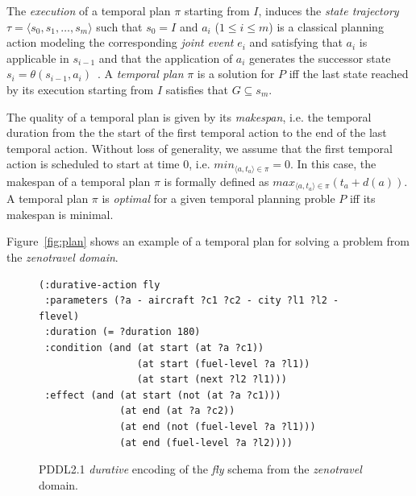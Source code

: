 \documentclass[letterpaper]{article} %
\newcommand{\tup}[1]{{\langle #1 \rangle}}
\begin{document}
The {\em execution} of a temporal plan $\pi$ starting from $I$, induces the {\em state trajectory} $\tau=\tup{s_0, s_1, \ldots, s_m}$ such that $s_0=I$ and $a_i$ ({\small $1\leq i\leq m$}) is a classical planning action modeling the corresponding {\em joint event} $e_i$ and satisfying that $a_i$ is applicable in $s_{i-1}$ and that the application of $a_i$ generates the successor state $s_i=\theta(s_{i-1},a_i)$~\cite{jimenez2015temporal}. A {\em temporal plan} $\pi$ is a solution for $P$ iff the last state reached by its execution starting from $I$ satisfies that $G\subseteq s_m$.

The quality of a temporal plan is given by its {\em makespan}, i.e. the temporal duration from the the start of the first temporal action to the end of the last temporal action. Without loss of generality, we assume that the first temporal action is scheduled to start at time 0, i.e. $min_{\tup{a,t_a}\in\pi}= 0$. In this case, the makespan of a temporal plan $\pi$ is formally defined as $max_{\tup{a,t_a}\in\pi}(t_a+d(a))$. A temporal plan $\pi$ is {\em optimal} for a given temporal planning proble $P$ iff its makespan is minimal.

Figure~\ref{fig:plan} shows an example of a temporal plan for solving a problem from the {\em zenotravel domain}.

\begin{figure}
	\begin{scriptsize}
		\begin{verbatim}
(:durative-action fly 
 :parameters (?a - aircraft ?c1 ?c2 - city ?l1 ?l2 - flevel)
 :duration (= ?duration 180)
 :condition (and (at start (at ?a ?c1))
                 (at start (fuel-level ?a ?l1))
                 (at start (next ?l2 ?l1)))
 :effect (and (at start (not (at ?a ?c1)))
              (at end (at ?a ?c2))
              (at end (not (fuel-level ?a ?l1)))
              (at end (fuel-level ?a ?l2)))) 
		\end{verbatim}
	\end{scriptsize}
	\caption{PDDL2.1 {\em durative} encoding of the {\em fly} schema from the {\em zenotravel} domain.}
	\label{fig:flyt}
\end{figure}
\end{document}
